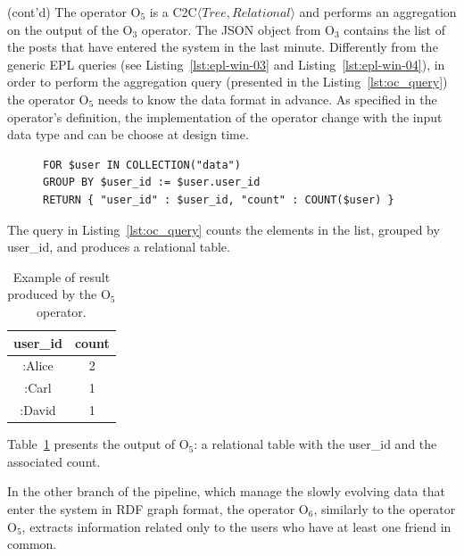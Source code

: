 \begin{Example}
(cont'd) The operator O$_5$ is a C2C$\langle Tree,Relational\rangle$ and performs an aggregation on the output of the O$_3$ operator. 
The JSON object from O$_3$ contains the list of the posts that have entered the system in the last minute.
Differently from the generic EPL queries (see Listing~\ref{lst:epl-win-03} and Listing~\ref{lst:epl-win-04}), in order to perform the aggregation query (presented in the Listing~\ref{lst:oc_query}) the operator O$_5$ needs to know the data format in advance. As specified in the operator's definition, the implementation of the operator change with the input data type and can be choose at design time.

\begin{figure}[ht]
\begin{minipage}{0.95\linewidth}
\begin{lstlisting}[caption={JSONiq Query for aggregating JSON element, applied by the operators O$_5$.},label=lst:oc_query,style=JSONIQ]
FOR $user IN COLLECTION("data")
GROUP BY $user_id := $user.user_id
RETURN { "user_id" : $user_id, "count" : COUNT($user) }
\end{lstlisting}
\end{minipage}
\end{figure}

The query in Listing~\ref{lst:oc_query} counts the elements in the list, grouped by user\_id, and produces a relational table. 

\begin{table}[ht]
\centering
\caption{Example of result produced by the O$_5$ operator.}
\label{tbl:oc_res}
    \begin{tabular}{|c|c|}
        \hline
        \textbf{user\_id} & \textbf{count} \\ \hline
        :Alice             & 2              \\ \hline
        :Carl              & 1              \\ \hline
        :David             & 1              \\ \hline
    \end{tabular}
\end{table}

Table~\ref{tbl:oc_res} presents the output of O$_5$: a relational table with the user\_id and the associated count.

In the other branch of the pipeline, which manage the slowly evolving data that enter the system in RDF graph format, the operator O$_6$, similarly to the operator O$_5$, extracts information related only to the users who have at least one friend in common.  


\end{Example}
